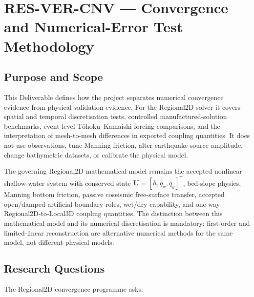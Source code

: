 
\section{RES-VER-CNV --- Convergence and Numerical-Error Test Methodology}
\label{sec:res-ver-cnv}

\subsection{Purpose and Scope}
\label{sec:res-ver-cnv-purpose}

This Deliverable defines how the project separates numerical
convergence evidence from physical validation evidence. For the
Regional2D solver it covers spatial and temporal discretisation tests,
controlled manufactured-solution benchmarks, event-level
Tōhoku--Kamaishi forcing comparisons, and the interpretation of
mesh-to-mesh differences in exported coupling quantities. It does not
use observations, tune Manning friction, alter earthquake-source
amplitude, change bathymetric datasets, or calibrate the physical model.

The governing Regional2D mathematical model remains the accepted
nonlinear shallow-water system with conserved state
$\mathbf{U}=[h,q_x,q_y]^{\mathsf{T}}$, bed-slope physics, Manning
bottom friction, passive coseismic free-surface transfer, accepted
open/damped artificial boundary roles, wet/dry capability, and one-way
Regional2D-to-Local3D coupling quantities. The distinction between this
mathematical model and its numerical discretisation is mandatory:
first-order and limited-linear reconstruction are alternative numerical
methods for the same model, not different physical models.

\subsection{Research Questions}
\label{sec:res-ver-cnv-research-questions}

The Regional2D convergence programme asks:

